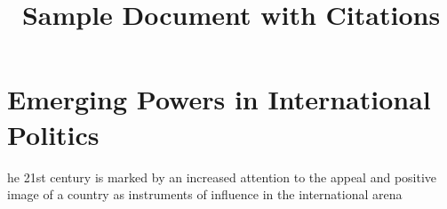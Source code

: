 \documentclass{article}
\begin{document}
	
	\title{Sample Document with Citations}
	\author{}
	\date{}
	\maketitle
	
	\section{Emerging Powers in International Politics}
	  he 21st century is marked by an increased attention to the appeal and positive image of a country as instruments of influence in the international arena
    \cite{}
 
	
	
	
	
\end{document}
